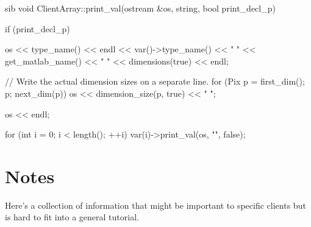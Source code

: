 \documentclass{dods-paper}
\begin{document}


\begin{vcode}{sib}
void
ClientArray::print_val(ostream &os, string, bool print_decl_p)
{
    if (print_decl_p) {
        os << type_name() << endl << var()->type_name() << " " 
           << get_matlab_name() << " " << dimensions(true)
           << endl;

        // Write the actual dimension sizes on a separate line.
        for (Pix p = first_dim(); p; next_dim(p))
            os << dimension_size(p, true) << " ";

        os << endl;
    }

    for (int i = 0; i < length(); ++i)
        var(i)->print_val(os, "", false);
}    
\end{vcode}


\section{Notes}

Here's a collection of information that might be important to specific
clients but is hard to fit into a general tutorial.
\end{document}
